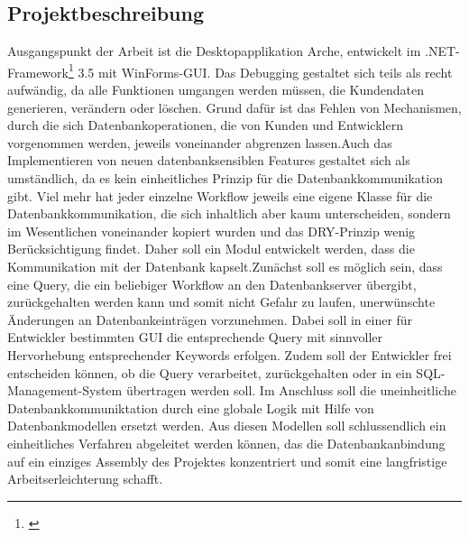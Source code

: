 \documentclass[11pt,toc=sectionentrywithoutdots, 
headheight=44pt, headings=optiontoheadandtoc, hyperfootnotes=false, hypertexnames=false]{scrartcl}
\begin{document}
\subsection{Projektbeschreibung}
Ausgangspunkt der Arbeit ist die Desktopapplikation \glqq Arche\grqq{}, entwickelt im .NET-Framework\footnote{\cite{Microsoft2020}} 3.5 mit WinForms-\acs{GUI}. Das Debugging gestaltet sich teils als recht aufwändig, da alle Funktionen umgangen werden müssen, die Kundendaten generieren, verändern oder löschen. Grund dafür ist das Fehlen von Mechanismen, durch die sich Datenbankoperationen, die von Kunden und Entwicklern vorgenommen werden, jeweils voneinander abgrenzen lassen.\newline Auch das Implementieren von neuen datenbanksensiblen Features gestaltet sich als umständlich, da es kein einheitliches Prinzip für die Datenbankkommunikation gibt. Viel mehr hat jeder einzelne Workflow jeweils eine eigene Klasse für die Datenbankkommunikation, die sich inhaltlich aber kaum unterscheiden, sondern im Wesentlichen voneinander kopiert wurden und das \acs{DRY}-Prinzip wenig Berücksichtigung findet. Daher soll ein Modul entwickelt werden, dass die Kommunikation mit der Datenbank kapselt.\newline\newline Zunächst soll es möglich sein, dass eine \gls{Query}, die ein beliebiger Workflow an den Datenbankserver übergibt, zurückgehalten werden kann und somit nicht Gefahr zu laufen, unerwünschte Änderungen an Datenbankeinträgen vorzunehmen. Dabei soll in einer für Entwickler bestimmten GUI die entsprechende Query mit sinnvoller Hervorhebung entsprechender Keywords erfolgen. Zudem soll der Entwickler frei entscheiden können, ob die Query verarbeitet, zurückgehalten oder in ein \acs{SQL}-Management-System übertragen werden soll. Im Anschluss soll die uneinheitliche Datenbankkommuniktation durch eine globale Logik mit Hilfe von Datenbankmodellen ersetzt werden. Aus diesen Modellen soll schlussendlich ein einheitliches Verfahren abgeleitet werden können, das die Datenbankanbindung auf ein einziges \gls{Assembly} des Projektes konzentriert und somit eine langfristige Arbeitserleichterung schafft.
\end{document}
